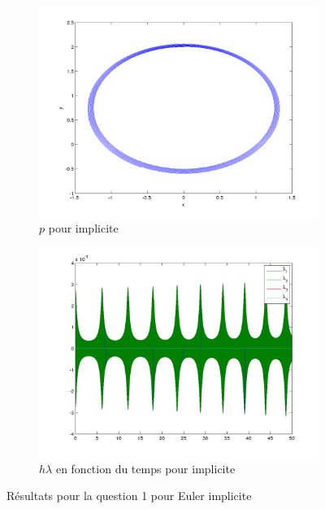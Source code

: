 \begin{figure}[!ht]
\begin{subfigure}[b]{0.45\textwidth}
    \includegraphics[width=\textwidth]{images/Q1_implicite_p.png}
    \caption{$p$ pour implicite}
    \label{fig:q1_implicite_p}
  \end{subfigure}
  \begin{subfigure}[b]{0.45\textwidth}
    \includegraphics[width=\textwidth]{images/Q1_implicite_lambda.png}
    \caption{$h\lambda$ en fonction du temps pour implicite}
    \label{fig:q1_implicite_lambda}
  \end{subfigure}
  \caption{Résultats pour la question 1 pour Euler implicite}
  \label{fig:q1_imp}
\end{figure}

